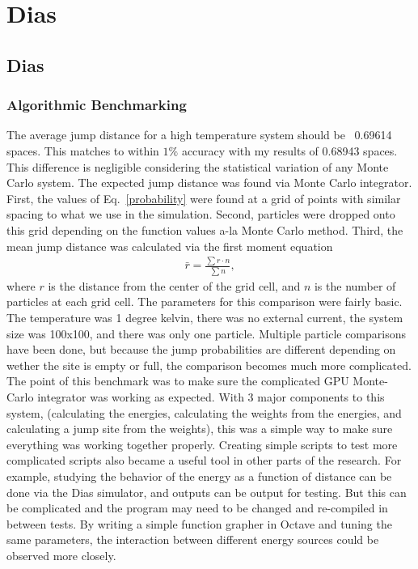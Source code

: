\chapter{Dias}		%
\label{codechap}
\section{Dias}

\subsection{Algorithmic Benchmarking}
The average jump distance for a high temperature system should be ~0.69614 spaces. This matches to within $1\%$ accuracy with my results of 0.68943 spaces. This difference is negligible considering the statistical variation of any Monte Carlo system. The expected jump distance was found via Monte Carlo integrator. First, the values of Eq.~\ref{probability} were found at a grid of points with similar spacing to what we use in the simulation. Second, particles were dropped onto this grid depending on the function values a-la Monte Carlo method. Third, the mean jump distance was calculated via the first moment equation
\begin{eqnarray}
\bar r = \frac {\sum r \cdot n} {\sum n}, 
\label{firstMoment}
\end{eqnarray}
where $r$ is the distance from the center of the grid cell, and $n$ is the number of particles at each grid cell. The parameters for this comparison were fairly basic. The temperature was 1 degree kelvin, there was no external current, the system size was 100x100, and there was only one particle. Multiple particle comparisons have been done, but because the jump probabilities are different depending on wether the site is empty or full, the comparison becomes much more complicated. The point of this benchmark was to make sure the complicated GPU Monte-Carlo integrator was working as expected. With 3 major components to this system, (calculating the energies, calculating the weights from the energies, and calculating a jump site from the weights), this was a simple way to make sure everything was working together properly. Creating simple scripts to test more complicated scripts also became a useful tool in other parts of the research. For example, studying the behavior of the energy as a function of distance can be done via the Dias simulator, and outputs can be output for testing. But this can be complicated and the program may need to be changed and re-compiled in between tests. By writing a simple function grapher in Octave and tuning the same parameters, the interaction between different energy sources could be observed more closely.

